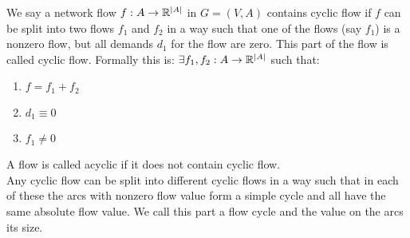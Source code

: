 \begin{definition}
 We say a network flow $f:A\to \mathbb{R}^{|A|}$ in $G=(V,A)$ contains cyclic flow if $f$ can be split into two flows $f_1$ 
and $f_2$ in a way such that one of the flows (say $f_1$) is a nonzero flow, but all demands $d_1$ for the flow are 
zero. This part of the flow is called cyclic flow. 
Formally this is:
$ \exists f_1, f_2:A\to \mathbb{R}^{|A|}$ such that: 
\begin{enumerate}
 \item $f=f_1+f_2$
 \item $ d_1\equiv 0 $
 \item $ f_1\neq 0$
\end{enumerate}
A flow is called acyclic if it does not contain cyclic flow.\\

Any cyclic flow can be split into different cyclic flows in a way such that in each of these the arcs with nonzero 
flow value form a simple cycle and all have the same absolute flow value. We call this part a flow cycle and the value 
on the arcs its size.

% 


\end{definition}
